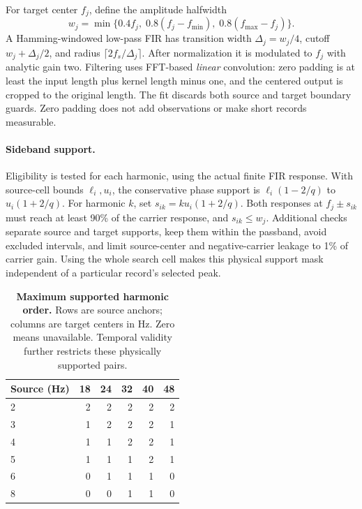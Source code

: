 \documentclass[10pt,twocolumn,letterpaper]{article}
\newcommand{\TableStyle}{\fontsize{8}{9.5}\selectfont\setlength{\tabcolsep}{3pt}\renewcommand{\arraystretch}{1.10}}
\begin{document}
For target center $f_j$, define the amplitude halfwidth
\begin{equation}
w_j=\min\{0.4f_j,\;0.8(f_j-f_{\min}),\;
                       0.8(f_{\max}-f_j)\}.
\label{eq:amp-width}
\end{equation}
A Hamming-windowed low-pass FIR has transition width
$\Delta_j=w_j/4$, cutoff $w_j+\Delta_j/2$, and radius
$\lceil2f_s/\Delta_j\rceil$. After normalization it is modulated to
$f_j$ with analytic gain two. Filtering uses FFT-based \emph{linear}
convolution: zero padding is at least the input length plus kernel
length minus one, and the centered output is cropped to the original
length. The fit discards both source and target boundary guards.
Zero padding does not add observations or make short records measurable.

\paragraph{Sideband support.}
Eligibility is tested for each harmonic, using the actual finite FIR
response. With source-cell bounds $\ell_i,u_i$, the conservative phase
support is $\ell_i(1-2/q)$ to $u_i(1+2/q)$. For harmonic $k$, set
$s_{ik}=ku_i(1+2/q)$. Both responses at $f_j\pm s_{ik}$ must reach
at least 90\% of the carrier response, and $s_{ik}\leq w_j$.
Additional checks separate source and target supports, keep them within
the passband, avoid excluded intervals, and limit source-center and
negative-carrier leakage to 1\% of carrier gain. Using the whole
search cell makes this physical support mask independent of a
particular record's selected peak.

\begin{table}[t]
\centering\TableStyle
\caption{\textbf{Maximum supported harmonic order.} Rows are source
anchors; columns are target centers in Hz. Zero means unavailable.
Temporal validity further restricts these physically supported pairs.}
\label{tab:operator-support}
\begin{tabular*}{\linewidth}{@{\extracolsep{\fill}}lrrrrr@{}}
\toprule
Source (Hz) & 18 & 24 & 32 & 40 & 48\\
\midrule
2 & 2 & 2 & 2 & 2 & 2\\
3 & 1 & 2 & 2 & 2 & 1\\
4 & 1 & 1 & 2 & 2 & 1\\
5 & 1 & 1 & 1 & 2 & 1\\
6 & 0 & 1 & 1 & 1 & 0\\
8 & 0 & 0 & 1 & 1 & 0\\
\bottomrule
\end{tabular*}
\end{table}
\end{document}

